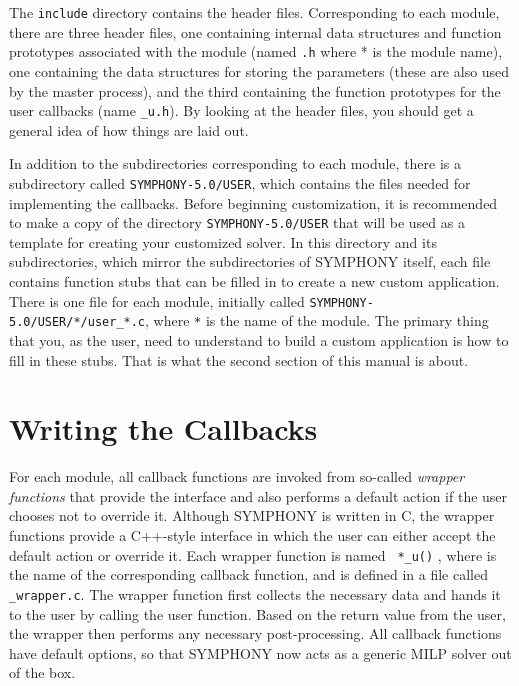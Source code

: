 The {\tt include} directory contains the header files. Corresponding
to each module, there are three header files, one containing internal
data structures and function prototypes associated with the module
(named {\tt *.h} where * is the module name), one containing the data
structures for storing the parameters (these are also used by the
master process), and the third containing the function prototypes for
the user callbacks (name {\tt *\_u.h}). By looking at the header files, you
should get a general idea of how things are laid out.

In addition to the subdirectories corresponding to each module, there is a
subdirectory called \texttt{SYMPHONY-5.0/USER}, which contains the files
needed for implementing the callbacks. Before beginning
customization, it is recommended to make a copy of the directory
\texttt{SYMPHONY-5.0/USER} that will be used as a template for creating your
customized solver. In this directory and its subdirectories, which mirror the
subdirectories of SYMPHONY itself, each file contains function stubs that can
be filled in to create a new custom application. There is one file for each
module, initially called \texttt{SYMPHONY-5.0/USER/*/user\_*.c}, where
\texttt{*} is the name of the module. The primary thing that you, as the user,
need to understand to build a custom application is how to fill in these
stubs. That is what the second section of this manual is about.

\section{Writing the Callbacks}

For each module, all callback functions are invoked from so-called \emph{wrapper
functions} that provide the interface and also performs a default action if
the user chooses not to override it. Although SYMPHONY is written in C, the
wrapper functions provide a C++-style interface in which the user can either
accept the default action or override it. Each wrapper function is named {\tt
*\_u()} , where {\tt *} is the name of the corresponding callback function, and is
defined in a file called {\tt *\_wrapper.c}. The wrapper function first
collects the necessary data and hands it to the user by calling the user
function. Based on the return value from the user, the wrapper then performs
any necessary post-processing. All callback functions have default options, so
that SYMPHONY now acts as a generic MILP solver out of the box.

